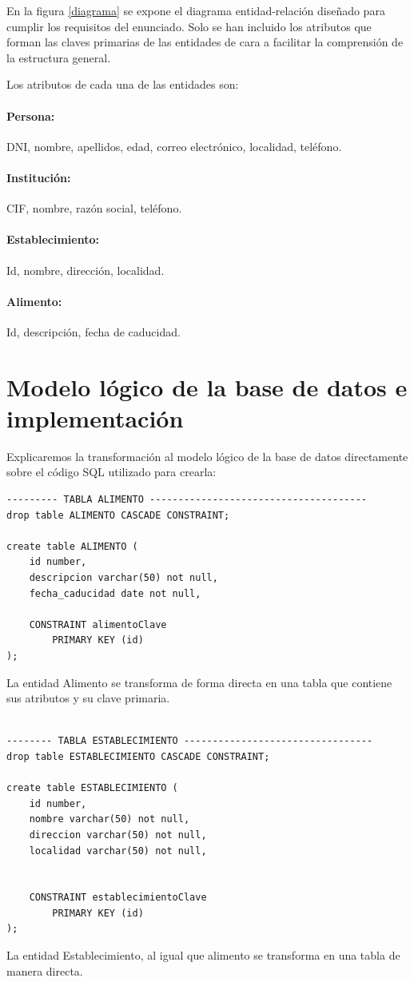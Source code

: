 \documentclass[11pt]{article}
\begin{document}
En la figura \ref{diagrama} se expone el diagrama entidad-relación diseñado para cumplir los requisitos del enunciado. Solo se han incluido los atributos que forman las claves primarias de las entidades de cara a facilitar la comprensión de la estructura general.

Los atributos de cada una de las entidades son:

\paragraph{Persona: }
 DNI, nombre, apellidos, edad, correo electrónico, localidad, teléfono.
 
\paragraph{Institución: }
CIF, nombre, razón social, teléfono.

\paragraph{Establecimiento: }
Id, nombre, dirección, localidad.

\paragraph{Alimento: }
Id, descripción, fecha de caducidad.

\section{Modelo lógico de la base de datos e implementación}

Explicaremos la transformación al modelo lógico de la base de datos directamente sobre el código SQL utilizado para crearla:

\begin{lstlisting}[style=SQL]
--------- TABLA ALIMENTO --------------------------------------
drop table ALIMENTO CASCADE CONSTRAINT;

create table ALIMENTO (
	id number,
	descripcion varchar(50) not null,
	fecha_caducidad date not null,
	
	CONSTRAINT alimentoClave 
		PRIMARY KEY (id)
);
\end{lstlisting}
La entidad Alimento se transforma de forma directa en una tabla que contiene sus atributos y su clave primaria.

\begin{lstlisting}[style=SQL]

-------- TABLA ESTABLECIMIENTO ---------------------------------
drop table ESTABLECIMIENTO CASCADE CONSTRAINT;

create table ESTABLECIMIENTO (
	id number,
	nombre varchar(50) not null,
	direccion varchar(50) not null,
	localidad varchar(50) not null,
	

	CONSTRAINT establecimientoClave 
		PRIMARY KEY (id)
);
\end{lstlisting}
La entidad Establecimiento, al igual que alimento se transforma en una tabla de manera directa.
\end{document}
